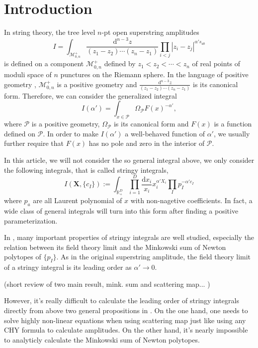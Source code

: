 \documentclass[12pt]{article}
\theoremstyle{definition}
\theoremstyle{plain}
\newcommand{\dif}{\mathrm{d}} %
\begin{document}
\section{Introduction}

In string theory, the tree level $n$-pt open superstring amplitudes
\[
	I=\int_{\mathcal M_{0,n}^+}\frac{\dif^{n-3}z}{(z_1-z_2)\cdots (z_n-z_1)}\prod_{i<j}
	|z_i-z_j|^{\alpha' s_{ab}}
\]
is defined on a component $\mathcal M_{0,n}^+$ defined by $z_1<z_2<\cdots < z_n$ 
of real points of moduli space of $n$ punctures on the Riemann sphere. 
In the language of positive geometry \cite{}, $\mathcal M_{0,n}^+$ is a positive
geometry and $\frac{\dif^{n-3}z}{(z_1-z_2)\cdots (z_n-z_1)}$ is its canonical form. Therefore,
we can consider the generalized integral 
\[
	I(\alpha')=\int_{x\in \mathcal P} \Omega_{\mathcal P} F(x)^{-\alpha'},
\] 
where $\mathcal P$ is a positive geometry, $\Omega_{\mathcal P}$ is its canonical form
and $F(x)$ is a function defined on $\mathcal P$. In order to make $I(\alpha')$ a 
well-behaved function of $\alpha'$, we usually further require that $F(x)$ has no pole
and zero in the interior of $\mathcal P$. 

In this article, we will not consider the so general integral above, we only consider the 
following integrals, that is called stringy integrals, 
\begin{equation}\label{int1}
	I(\mathbf X,\{c_I\}):=\int_{\mathbb R_+^D}\prod_{i=1}^D\frac{\dif x_i}{x_i}x_i^{\alpha' X_i}
	\prod_{I} p_I^{-\alpha' c_I}
\end{equation}
where $p_a$ are all Laurent polynomial of $x$ with non-nagetive coefficients. 
In fact, a wide class of general integrals 
will turn into this form after finding a positive parameterization. 

In \cite{}, many important properties of stringy integrals are well studied, especially the 
relation between its field theory limit and the Minkowski sum of Newton polytopes of $\{p_I\}$.
As in the original superstring amplitude, the field theory limit of a stringy integral is 
its leading order as $\alpha'\to 0$. 

(short review of two main result, mink. sum and scattering map... \cite{})

However, it's really difficult to calculate 
the leading order of stringy integrals directly from above two general propositions 
in \cite{}.
On the one hand, one needs to solve highly non-linear equations when using scattering map
just like using any CHY formula to calculate amplitudes.
On the other hand, it's nearly impossible to analyticly calculate the Minkowski sum of
Newton polytopes.
\end{document}
